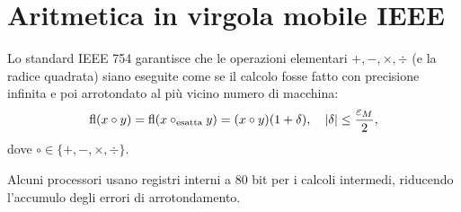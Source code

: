 \section{Aritmetica in virgola mobile IEEE}
\label{sec:aritmetica_ieee}

Lo standard IEEE 754 garantisce che le operazioni elementari $+,-,\times,\div$ (e la
radice quadrata) siano eseguite come se il calcolo fosse fatto con precisione infinita
e poi arrotondato al più vicino numero di macchina:
\begin{equation}
  \operatorname{fl}(x \circ y) = \operatorname{fl}(x \circ_\text{esatta} y) = (x \circ y)(1 + \delta),
  \quad |\delta| \leq \frac{\varepsilon_M}{2},
  \label{eq:ieee_op}
\end{equation}
dove $\circ \in \{+,-,\times,\div\}$.

\begin{remark}
Alcuni processori usano registri interni a 80 bit per i calcoli intermedi, riducendo
l'accumulo degli errori di arrotondamento.
\end{remark}
